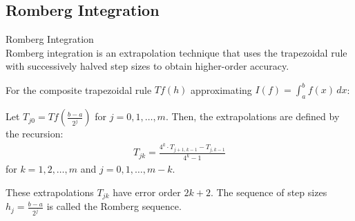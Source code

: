 \subsection{Romberg Integration}

\begin{definition}{Romberg Integration}\\
Romberg integration is an extrapolation technique that uses the trapezoidal rule with successively halved step sizes to obtain higher-order accuracy.

For the composite trapezoidal rule $Tf(h)$ approximating $I(f) = \int_a^b f(x) \, dx$:

Let $T_{j0} = Tf\left(\frac{b-a}{2^j}\right)$ for $j = 0, 1, \ldots, m$. Then, the extrapolations are defined by the recursion:
\begin{align*}
T_{jk} = \frac{4^k \cdot T_{j+1,k-1} - T_{j,k-1}}{4^k - 1}
\end{align*}
for $k = 1, 2, \ldots, m$ and $j = 0, 1, \ldots, m-k$.

These extrapolations $T_{jk}$ have error order $2k+2$. The sequence of step sizes $h_j = \frac{b-a}{2^j}$ is called the Romberg sequence.
\end{definition}

